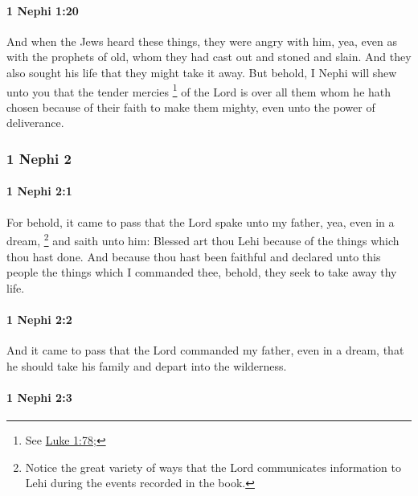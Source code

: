 		\paragraph{1 Nephi 1:20} %
			\label{1NEPHI-1-20}

			And when the Jews heard these things, they were angry with him,
			yea, even as with the prophets of old,
			whom they had cast out and stoned and slain.
			And they also sought his life that they might take it away.
			But behold, I Nephi will shew unto you
			that the tender mercies%
				\footnote{%
					See \hyperref[LUKE-1-78]{Luke 1:78};
					}
			of the Lord is over all them
			whom he hath chosen because of their faith
			to make them mighty, even unto the power of deliverance.
			
	\subsubsection{1 Nephi 2} %
		\label{1NEPHI-2}
		
		\paragraph{1 Nephi 2:1} %
			\label{1NEPHI-2-1}

			For behold, it came to pass that the Lord spake unto my father,
			yea, even in a dream,%
				\footnote{%
					Notice the great variety of ways that the Lord communicates information to Lehi during the events recorded in the book.
					}
			and saith unto him:
			Blessed art thou Lehi because of the things which thou hast done.
			And because thou hast been faithful
			and declared unto this people the things which I commanded thee,
			behold, they seek to take away thy life.

		\paragraph{1 Nephi 2:2} %
			\label{1NEPHI-2-2}

			And it came to pass that the Lord commanded my father, even in a dream,
			that he should take his family and depart into the wilderness.

		\paragraph{1 Nephi 2:3} %
			\label{1NEPHI-2-3}

